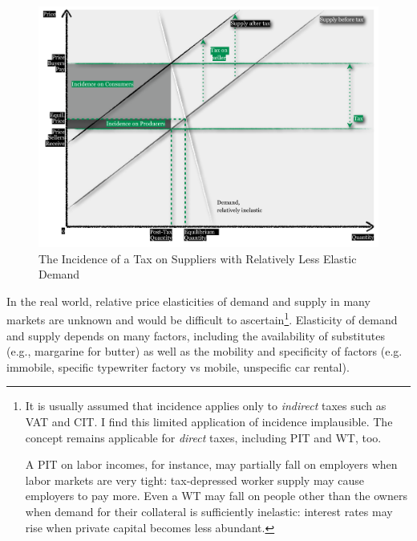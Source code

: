  \begin{figure}[htbp]
	\centering
	\includegraphics[width=1\textwidth]{./img/different-incidence}  
	\caption[Incidence of a Tax on Suppliers with Relatively Inelastic Demand]{The Incidence of a Tax on Suppliers with Relatively Less Elastic Demand}
	\label{fig:different-incidence}
\end{figure}

In the real world, relative price elasticities of demand and supply in many markets are unknown and would be difficult to ascertain\footnote{
	It is usually assumed that incidence applies only to \emph{indirect} taxes such as \gls{VAT} and \gls{CIT}. I find this limited application of incidence implausible. The concept remains applicable for \emph{direct} taxes, including \gls{PIT} and \gls{WT}, too. 
	
	A \gls{PIT} on labor incomes, for instance, may partially fall on employers when labor markets are very tight: tax-depressed worker supply may cause employers to pay more. Even a \gls{WT} may fall on people other than the owners when demand for their collateral is sufficiently inelastic: interest rates may rise when private capital becomes less abundant.}. 
Elasticity of demand and supply depends on many factors, including the availability of substitutes (e.g., margarine for butter) as well as the mobility and specificity of factors (e.g. immobile, specific typewriter factory vs mobile, unspecific car rental).

